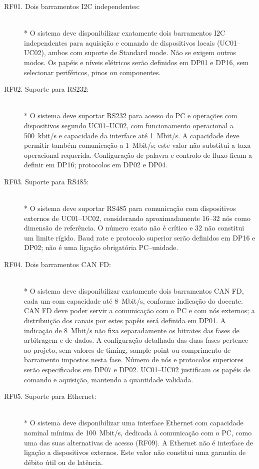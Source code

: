 \begin{description}
    \item[RF01. Dois barramentos I2C independentes:] \hfill\\*
    O sistema deve disponibilizar exatamente dois barramentos I2C
    independentes para aquisição e comando de dispositivos locais
    (UC01--UC02), ambos com suporte de Standard mode. Não se exigem outros
    modos. Os papéis e níveis elétricos serão definidos em DP01 e DP16,
    sem selecionar periféricos, pinos ou componentes.

    \item[RF02. Suporte para RS232:] \hfill\\*
    O sistema deve suportar RS232 para acesso do PC e operações com
    dispositivos segundo UC01--UC02, com funcionamento operacional a
    500~kbit/s e capacidade da interface até 1~Mbit/s. A capacidade deve
    permitir também comunicação a 1~Mbit/s; este valor não substitui a
    taxa operacional requerida. Configuração de palavra e controlo de
    fluxo ficam a definir em DP16; protocolos em DP02 e DP04.

    \item[RF03. Suporte para RS485:] \hfill\\*
    O sistema deve suportar RS485 para comunicação com dispositivos
    externos de UC01--UC02, considerando aproximadamente 16--32 nós como
    dimensão de referência. O número exato não é crítico e 32 não constitui
    um limite rígido. Baud rate e protocolo superior serão definidos em
    DP16 e DP02; não é uma ligação obrigatória PC--unidade.

    \item[RF04. Dois barramentos CAN FD:] \hfill\\*
    O sistema deve disponibilizar exatamente dois barramentos CAN FD,
    cada um com capacidade até 8~Mbit/s, conforme indicação do docente.
    CAN FD deve poder servir a comunicação com o PC e com nós externos;
    a distribuição dos canais por estes papéis será definida em DP01.
    A indicação de 8~Mbit/s não fixa separadamente os bitrates das fases
    de arbitragem e de dados. A configuração detalhada das duas fases
    pertence ao projeto, sem valores de timing, sample point ou comprimento
    de barramento impostos nesta fase. Número de nós e protocolos superiores
    serão especificados em DP07 e DP02. UC01--UC02 justificam os papéis
    de comando e aquisição, mantendo a quantidade validada.

    \item[RF05. Suporte para Ethernet:] \hfill\\*
    O sistema deve disponibilizar uma interface Ethernet com capacidade
    nominal mínima de 100~Mbit/s, dedicada à comunicação com o PC, como
    uma das suas alternativas de acesso (RF09). A Ethernet não é interface
    de ligação a dispositivos externos. Este valor não constitui uma garantia
    de débito útil ou de latência.


\end{description}
